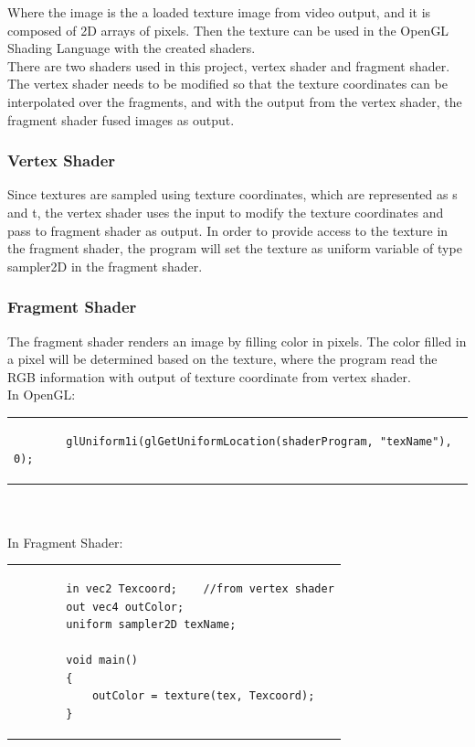 \documentclass[letterpaper,10pt,serif,draftclsnofoot,onecolumn,compsoc,titlepage]{IEEEtran}
\begin{document}
Where the image is the a loaded texture image from video output, and it is composed of 
2D arrays of pixels. Then the texture can be used in the OpenGL Shading Language with 
the created shaders.\\

There are two shaders used in this project, vertex shader and fragment shader. The 
vertex shader needs to be modified so that the texture coordinates can be interpolated 
over the fragments, and with the output from the vertex shader, the fragment shader 
fused images as output. \\

\subsubsection{Vertex Shader}

Since textures are sampled using texture coordinates, which are represented as s and 
t, the vertex shader uses the input to modify the texture coordinates and pass to 
fragment shader as output. In order to provide access to the texture in the fragment 
shader, the program will set the texture as uniform variable of type sampler2D in the 
fragment shader.\\

\subsubsection{Fragment Shader}

The fragment shader renders an image by filling color in pixels. The color filled in a 
pixel will be determined based on the texture, where the program read the RGB 
information with output of texture coordinate from vertex shader.\\

In OpenGL:\\
\begin{tabular}{|p{15cm}|}
	\begin{lstlisting}
		glUniform1i(glGetUniformLocation(shaderProgram, "texName"), 0);
	\end{lstlisting}
\end{tabular}
\\
\\
In Fragment Shader:\\
\begin{tabular}{|p{15cm}|}
	\begin{lstlisting}
   		in vec2 Texcoord;    //from vertex shader
   		out vec4 outColor;
   		uniform sampler2D texName;

   		void main()
   		{
        	outColor = texture(tex, Texcoord);
   		}
	\end{lstlisting}
\end{tabular}
\end{document}
